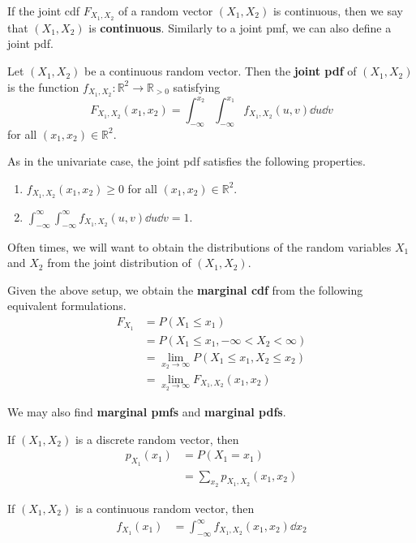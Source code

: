 If the joint cdf $F_{X_1,X_2}$ of a random vector $(X_1,X_2)$ is continuous, then we say that $(X_1,X_2)$ is \textbf{continuous}. Similarly to a joint pmf, we can also define a joint pdf.

\begin{definition}
	Let $(X_1,X_2)$ be a continuous random vector. Then the \textbf{joint pdf} of $(X_1,X_2)$ is the function $f_{X_1,X_2}:\mathbb R^2\to\mathbb R_{>0}$ satisfying
	$$F_{X_1,X_2}(x_1,x_2)=\int_{-\infty}^{x_2}\int_{-\infty}^{x_1}f_{X_1,X_2}(u,v)\dd u\dd v$$
	for all $(x_1,x_2)\in\mathbb R^2$.
\end{definition}

As in the univariate case, the joint pdf satisfies the following properties.
\begin{enumerate}
	\item $f_{X_1,X_2}(x_1,x_2)\geq 0$ for all $(x_1,x_2)\in\mathbb R^2$.
	\item $\int_{-\infty}^{\infty}\int_{-\infty}^{\infty}f_{X_1,X_2}(u,v)\dd u\dd v=1$.
\end{enumerate}

Often times, we will want to obtain the distributions of the random variables $X_1$ and $X_2$ from the joint distribution of $(X_1,X_2)$.

Given the above setup, we obtain the \textbf{marginal cdf} from the following equivalent formulations.
\begin{align*}
	F_{X_1}&=P(X_1\leq x_1)\\
	&=P(X_1\leq x_1,-\infty<X_2<\infty)\\
	&=\lim_{x_2\to\infty}P(X_1\leq x_1,X_2\leq x_2)\\
	&=\lim_{x_2\to\infty} F_{X_1,X_2}(x_1,x_2)
\end{align*}

We may also find \textbf{marginal pmfs} and \textbf{marginal pdfs}.

If $(X_1,X_2)$ is a discrete random vector, then
\begin{align*}
	p_{X_1}(x_1)&=P(X_1=x_1)\\
	&=\sum_{x_2}p_{X_1,X_2}(x_1,x_2)
\end{align*}

If $(X_1,X_2)$ is a continuous random vector, then
\begin{align*}
	f_{X_1}(x_1)&=\int_{-\infty}^{\infty}f_{X_1,X_2}(x_1,x_2)\dd{x_2}\\
\end{align*}

